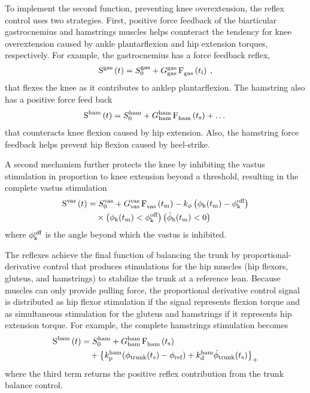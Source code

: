 To implement the second function, preventing knee overextension, the reflex
control uses two strategies. First, positive force feedback of the biarticular
gastrocnemius and hamstrings muscles helps counteract the tendency for knee
overextension caused by ankle plantarflexion and hip extension torques,
respectively. For example, the gastrocnemius has a force feedback reflex,
\begin{align}
    \func{S}[][\tn{gas}]{t} = S_0^\tn{gas} + 
        G_\tn{gas}^\tn{gas} \func{F}[\tn{gas}][]{t_\tn{l}} \:,
        \label{eq:gas_stim}
\end{align}
that flexes the knee as it contributes to anklep plantarflexion. The hamstring
also has a positive force feed back
\begin{align}
    \func{S}[][\tn{ham}]{t} = S_0^\tn{ham} + 
        G_\tn{ham}^\tn{ham} \func{F}[\tn{ham}][]{t_\tn{s}} + \ldots \:
        \label{eq:ham_stim}
\end{align}
that counteracts knee flexion caused by hip extension. Also, the hamstring force
feedback helps prevent hip flexion caused by heel-strike.

A second mechanism further protects the knee by inhibiting the vastus
stimulation in proportion to knee extension beyond a threshold, resulting in
the complete vastus stimulation
\begin{align}
    \func{S}[][\tn{vas}]{t} &= S_0^\tn{vas} + 
        G_\tn{vas}^\tn{vas} \func{F}[\tn{vas}][]{t_\tn{m}} 
            -k_\phi \left(\phi_\tn{k}(t_\tn{m}) - \phi_\tn{k}^\tn{off} \right)
            \notag \\
        &\quad \times 
            \left( \phi_\tn{k}(t_\tn{m}) < \phi_\tn{k}^\tn{off} \right)
            \left( \dot \phi_\tn{k}(t_\tn{m}) < 0\right) \label{eq:vas_stim_full} 
\end{align}
where $\phi_{\textnormal{k}}^{\textnormal{off}}$ is the angle beyond which the vastus is inhibited.

The reflexes achieve the final function of balancing the trunk by
proportional-derivative control that produces stimulations for the hip muscles
(hip flexors, gluteus, and hamstrings) to stabilize the trunk at a reference
lean. Because muscles can only provide pulling force, the proportional derivative
control signal is distributed as hip flexor stimulation if the signal represents
flexion torque and as simultaneous stimulation for the gluteus and hamstrings if
it represents hip extension torque. For example, the complete hamstrings
stimulation becomes
\begin{align}
    \func{S}[][\tn{ham}]{t} &= S_0^\tn{ham} + 
        G_\tn{ham}^\tn{ham} \func{F}[\tn{ham}][]{t_\tn{s}} \notag\\
            &\quad +  \left\{ k_\tn{p}^\tn{ham} 
            (\phi_\tn{trunk}(t_\tn{s}) - \phi_{\tn{ref}}) 
            + k_\tn{d}^\tn{ham} \dot{\phi}_{\tn{trunk}}(t_\tn{s}) \right\}_+ 
        \label{eq:ham_stim_full}
\end{align}
where the third term returns the positive reflex contribution from the trunk
balance control. 

